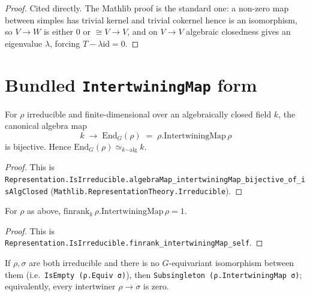 \begin{proof}
  \leanok
  Cited directly. The Mathlib proof is the standard one: a non-zero map
  between simples has trivial kernel and trivial cokernel hence is an
  isomorphism, so $V \to W$ is either $0$ or $\cong V \to V$, and on
  $V \to V$ algebraic closedness gives an eigenvalue $\lambda$, forcing
  $T - \lambda \mathrm{id} = 0$.
\end{proof}

\section{Bundled \texttt{IntertwiningMap} form}

\begin{theorem}
  \label{thm:schur-scalar}
  \mathlibok
  \leanok
  For $\rho$ irreducible and finite-dimensional over an algebraically closed
  field $k$, the canonical algebra map
  \[
     k \;\longrightarrow\; \mathrm{End}_G(\rho) \;=\; \rho.\mathrm{IntertwiningMap}\,\rho
  \]
  is bijective. Hence $\mathrm{End}_G(\rho) \simeq_{\!k\!\mathrm{-alg}} k$.
\end{theorem}

\begin{proof}
  \leanok
  This is
  \texttt{Representation.IsIrreducible.algebraMap\_intertwiningMap\_bijective\_of\_isAlgClosed}
  (\texttt{Mathlib.RepresentationTheory.Irreducible}).
\end{proof}

\begin{theorem}
  \label{thm:schur-finrank-self}
  \mathlibok
  \leanok
  For $\rho$ as above, $\mathrm{finrank}_k\, \rho.\mathrm{IntertwiningMap}\,\rho = 1$.
\end{theorem}

\begin{proof}
  \leanok
  This is
  \texttt{Representation.IsIrreducible.finrank\_intertwiningMap\_self}.
\end{proof}

\begin{theorem}
  \label{thm:schur-distinct}
  \mathlibok
  \leanok
  If $\rho, \sigma$ are both irreducible and there is no $G$-equivariant
  isomorphism between them (i.e.\ \texttt{IsEmpty (ρ.Equiv σ)}), then
  \texttt{Subsingleton (ρ.IntertwiningMap σ)}; equivalently, every
  intertwiner $\rho \to \sigma$ is zero.
\end{theorem}

